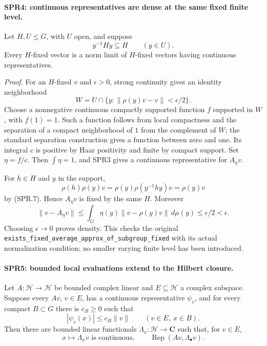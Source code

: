 \documentclass[11pt,a4paper]{article}
\numberwithin{equation}{section}
\theoremstyle{remark}\newtheorem{remark}[theorem]{Remark}
\begin{document}
\paragraph{SPR4: continuous representatives are dense at the same fixed finite level.}
\label{claim:SPR4}
Let \(H,U\le G\), with \(U\) open, and suppose
\[
          y^{-1}Hy\subseteq H\qquad(y\in U).
 \tag{SPR.7}
\]
Every \(H\)-fixed vector is a norm limit of \(H\)-fixed vectors
having continuous representatives.

\emph{Proof.}
For an \(H\)-fixed \(v\) and \(\epsilon>0\), strong continuity gives
an identity neighborhood
\[
 W=U\cap\{y:\|\rho(y)v-v\|<\epsilon/2\}.
\]
Choose a nonnegative continuous compactly supported function
\(f\) supported in \(W\), with \(f(1)=1\).
Such a function follows from local compactness and the separation
of a compact neighborhood of \(1\) from the complement of \(W\);
the standard separation construction gives a function between
zero and one.  Its integral \(c\) is positive by Haar positivity
and finite by compact support.
Set \(\eta=f/c\).  Then \(\int\eta=1\), and SPR3 gives a
continuous representative for \(A_\eta v\).

For \(h\in H\) and \(y\) in the support,
\[
 \rho(h)\rho(y)v
 =\rho(y)\rho(y^{-1}hy)v=\rho(y)v
\]
by (SPR.7).  Hence \(A_\eta v\) is fixed by the same \(H\).
Moreover
\[
 \|v-A_\eta v\|
 \le\int_G\eta(y)\|v-\rho(y)v\|\,d\mu(y)
 \le\epsilon/2<\epsilon.
\]
Choosing \(\epsilon\to0\) proves density.
This checks the original
\texttt{exists\_\allowbreak fixed\_\allowbreak average\_\allowbreak approx\_\allowbreak of\_\allowbreak subgroup\_\allowbreak fixed}
with its actual normalization condition; no smaller varying
finite level has been introduced.

\paragraph{SPR5: bounded local evaluations extend to the Hilbert closure.}
\label{claim:SPR5}
Let \(A:\mathcal H\to\mathcal H\) be bounded complex linear and
\(E\subseteq\mathcal H\) a complex subspace.
Suppose every \(Av\), \(v\in E\), has a continuous representative
\(\psi_v\), and for every compact \(B\subset G\) there is \(c_B\ge0\)
such that
\[
           |\psi_v(x)|\le c_B\|v\|
             \qquad(v\in E,\ x\in B).
 \tag{SPR.8}
\]
Then there are bounded linear functionals
\(\Lambda_x:\mathcal H\to\mathbf C\) such that, for \(v\in\overline E\),
\[
 x\longmapsto\Lambda_xv\text{ is continuous},\qquad
             \operatorname{Rep}(Av,\Lambda_\bullet v).
 \tag{SPR.9}
\]
\end{document}
